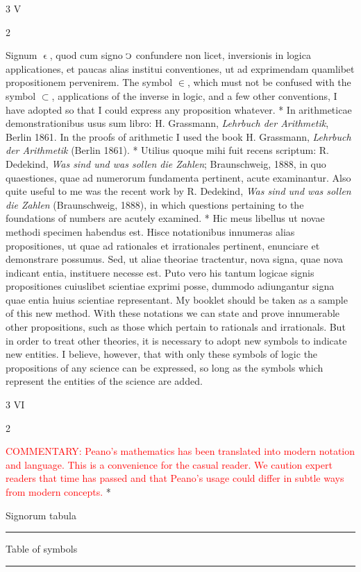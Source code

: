\documentclass{book}
\newcommand{\s}{\switchcolumn} %
\newcommand{\C}{\mathop{\sbox0{$\displaystyle$$\reflectbox{C}$} %
\raisebox{-\height+\ht0-0.05cm}[\ht0][\dp0]{\scalebox{0.8}[0.8]{\copy0}}}\displaylimits} %
\newcommand{\smallIn}{\ensuremath{\mathrel{\epsilon}}}
\newcommand\commentary[1]{\textcolor{red}{COMMENTARY: #1}}
\newcommand\peanoHeadingMedium[1]{ \vspace{1cm} {\Large #1} \nopagebreak[4]

  \noindent\rule{1cm}{0.4pt} \nopagebreak[1]}
\newcommand{\peanoPage}[1]{\vspace{1ex}

  \columnratio{0.475, 0.05, 0.475} \begin{paracol}{3} \centering \hdashrule{\columnwidth}{0.1mm}{0.1mm 1mm} \s #1 \s \hdashrule{\columnwidth}{0.1mm}{0.1mm 1mm} \end{paracol}

\vspace{1ex}}
\newenvironment{translateTwoCol}
               { %
                 \columnratio{0.5, 0.5} \begin{paracol}{2}
                 \newcommand{\LAT}{\switchcolumn[0]*}
                 \newcommand{\ENG}{\switchcolumn[1]}
               }
               { %
                 \let\ENG\undefined
                 \let\LAT\undefined
                 \end{paracol}
               }
\begin{document}
\peanoPage{V} %

\begin{translateTwoCol}
Signum $\smallIn$, quod cum signo $\C$ confundere non licet, inversionis in logica applicationes, et paucas alias institui conventiones, ut ad exprimendam quamlibet propositionem pervenirem.
\ENG
The symbol $\in$, which must not be confused with the symbol $\subset$, applications of the inverse in logic, and a few other conventions, I have adopted so that I could express any proposition whatever.
\LAT
In arithmeticae demonstrationibus usus sum libro: H. Grassmann, \emph{Lehrbuch der Arithmetik}, Berlin 1861.
\ENG
In the proofs of arithmetic I used the book H. Grassmann, \emph{Lehrbuch der Arithmetik} (Berlin 1861).
\LAT
Utilius quoque mihi fuit recens scriptum: R. Dedekind, \emph{Was sind und was sollen die Zahlen}; Braunschweig, 1888, in quo quaestiones, quae ad numerorum fundamenta pertinent, acute examinantur.
\ENG
Also quite useful to me was the recent work by R. Dedekind, \emph{Was sind und was sollen die Zahlen} (Braunschweig, 1888), in which questions pertaining to the foundations of numbers are acutely examined.
\LAT
Hic meus libellus ut novae methodi specimen habendus est. Hisce notationibus innumeras alias propositiones, ut quae ad rationales et irrationales pertinent, enunciare et demonstrare possumus. Sed, ut aliae theoriae tractentur, nova signa, quae nova indicant entia, instituere necesse est. Puto vero his tantum logicae signis propositiones cuiuslibet scientiae exprimi posse, dummodo adiungantur signa quae entia huius scientiae representant.
\ENG
My booklet should be taken as a sample of this new method. With these notations we can state and prove innumerable other propositions, such as those which pertain to rationals and irrationals. But in order to treat other theories, it is necessary to adopt new symbols to indicate new entities. I believe, however, that with only these symbols of logic the propositions of any science can be expressed, so long as the symbols which represent the entities of the science are added.
\end{translateTwoCol}

\peanoPage{VI} %

\begin{translateTwoCol}
\ENG
\commentary{Peano's mathematics has been translated into modern notation and language.  This is a convenience for the casual reader.  We caution expert readers that time has passed and that Peano's usage could differ in subtle ways from modern concepts.}  
\LAT  
\centering
{}
{}
\peanoHeadingMedium{Signorum tabula}
\ENG
\peanoHeadingMedium{Table of symbols}
\end{translateTwoCol}
\end{document}
